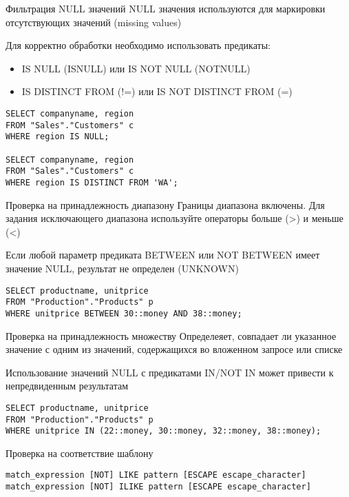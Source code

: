 \documentclass[12pt]{article}
\begin{document}
\begin{Example}{Фильтрация NULL значений}
    NULL значения используются для маркировки отсутствующих значений (missing values)

    Для корректно обработки необходимо использовать предикаты:

    \begin{itemize}
        \item IS NULL (ISNULL) или IS NOT NULL (NOTNULL)
        \item IS DISTINCT FROM (!=) или IS NOT DISTINCT FROM (=)
    \end{itemize}

\begin{lstlisting}
SELECT companyname, region
FROM "Sales"."Customers" c
WHERE region IS NULL;

SELECT companyname, region
FROM "Sales"."Customers" c
WHERE region IS DISTINCT FROM 'WA';
\end{lstlisting}
\end{Example}

\begin{Example}{Проверка на принадлежность диапазону}
    Границы диапазона включены. Для задания исключающего диапазона используйте операторы больше (>) и меньше (<)

    Если любой параметр предиката BETWEEN или NOT BETWEEN имеет значение NULL, результат не определен (UNKNOWN)

\begin{lstlisting}
SELECT productname, unitprice
FROM "Production"."Products" p
WHERE unitprice BETWEEN 30::money AND 38::money;
\end{lstlisting}
\end{Example}

\begin{Example}{Проверка на принадлежность множеству}
    Определеяет, совпадает ли указанное значение с одним из значений, содержащихся во вложенном запросе или списке

    Использование значений NULL с предикатами IN/NOT IN может привести к непредвиденным результатам

\begin{lstlisting}
SELECT productname, unitprice
FROM "Production"."Products" p
WHERE unitprice IN (22::money, 30::money, 32::money, 38::money);
\end{lstlisting}
\end{Example}

\begin{Example}{Проверка на соответствие шаблону}
\begin{lstlisting}
match_expression [NOT] LIKE pattern [ESCAPE escape_character]
match_expression [NOT] ILIKE pattern [ESCAPE escape_character]
\end{lstlisting}
\end{Example}
\end{document}
